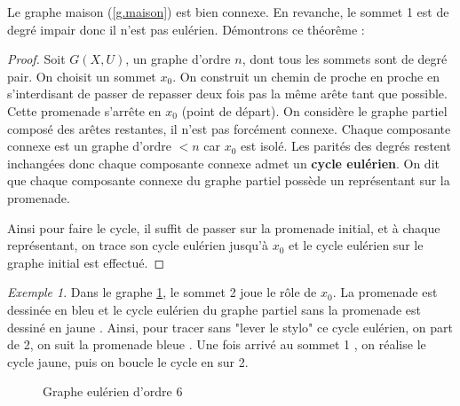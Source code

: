 \documentclass[12pt,a4paper]{scrartcl}
\newcommand{\G}{Soit $G(X,U)$, un graphe d'ordre $n$} %
\newcommand{\coul}[2]{\color{#1} #2 \color{black}} %
\theoremstyle{plain}
\theoremstyle{remark}
\newtheorem*{exemple}{Exemple}
\begin{document}
Le graphe maison (\ref{g.maison}) est bien connexe. En revanche, le sommet 1 est de degré impair donc il n'est pas eulérien. 
Démontrons ce théorême :
\begin{proof}
	\G, dont tous les sommets sont de degré pair. On choisit un sommet $x_0$. On construit un chemin de proche en proche en s'interdisant de passer de repasser deux fois pas la même arête tant que possible. Cette promenade s'arrête en $x_0$ (point de départ).
	On considère le graphe partiel composé des arêtes restantes, il n'est pas forcément connexe. Chaque composante connexe est un graphe d'ordre $< n$ car $x_0$ est isolé. Les parités des degrés restent inchangées donc chaque composante connexe admet un \textbf{cycle eulérien}. On dit que chaque composante connexe du graphe partiel possède un représentant sur la promenade.
	
Ainsi pour faire le cycle, il suffit de passer sur la promenade initial, et à chaque représentant, on trace son cycle eulérien jusqu'à $x_0$ et le cycle eulérien sur le graphe initial est effectué.
\end{proof}

\begin{exemple}
Dans le graphe \ref{g.eulerien}, le sommet \coul{red}{2} joue le rôle de $x_0$.
La promenade est dessinée en \coul{blue}{bleu} et le cycle eulérien du graphe partiel sans la promenade est dessiné en \coul{yellow}{jaune}.
 Ainsi, pour tracer sans "lever le stylo" ce cycle eulérien, on part de 2, on suit la promenade \coul{blue}{bleue}. Une fois arrivé au sommet \coul{purple}{1}
, on réalise le cycle jaune, puis on boucle le cycle en sur 2.
\end{exemple}

	\begin{figure}
	\centering
	\caption{Graphe eulérien d'ordre 6}\label{g.eulerien}
	\end{figure}
\end{document}
